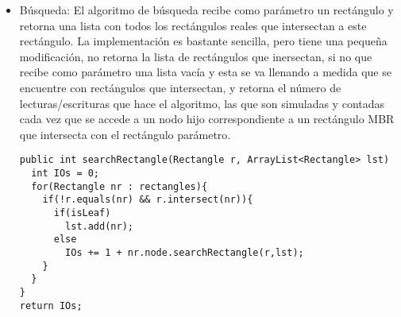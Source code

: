 \documentclass[letterpaper,12pt]{article}
\begin{document}
\begin{itemize}
\item B\'usqueda: El algoritmo de b\'usqueda recibe como par\'ametro un rect\'angulo y retorna una lista con todos los rect\'angulos reales que intersectan a este rect\'angulo. La implementaci\'on es bastante sencilla, pero tiene una pequeña modificaci\'on, no retorna la lista de rect\'angulos que inersectan, si no que recibe como par\'ametro una lista vac\'ia y esta se va llenando a medida que se encuentre con rect\'angulos que intersectan, y retorna el n\'umero de lecturas/escrituras que hace el algoritmo, las que son simuladas y contadas cada vez que se accede a un nodo hijo correspondiente a un rect\'angulo MBR que intersecta con el rect\'angulo par\'ametro.
\lstset{language=Java, breaklines=true, basicstyle=\footnotesize}
\begin{lstlisting}[frame=single]
public int searchRectangle(Rectangle r, ArrayList<Rectangle> lst)
  int IOs = 0;
  for(Rectangle nr : rectangles){
    if(!r.equals(nr) && r.intersect(nr)){
      if(isLeaf)
        lst.add(nr);
      else
        IOs += 1 + nr.node.searchRectangle(r,lst);
    }
  }
}
return IOs;
\end{lstlisting}

\end{itemize}
\end{document}
